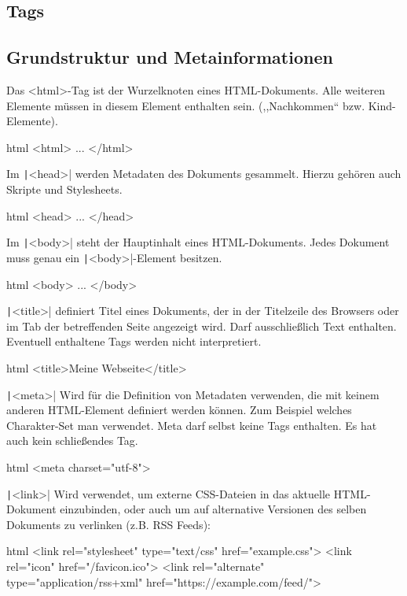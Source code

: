 \documentclass[10pt,a4paper]{article}
\begin{document}
\begin{multicols}{3}
\section*{Tags}
\subsection*{Grundstruktur und Metainformationen}
Das <html>-Tag ist der Wurzelknoten eines HTML-Dokuments. Alle weiteren Elemente müssen in diesem Element enthalten sein. (,,Nachkommen`` bzw. Kind-Elemente).
\begin{codebox}{html}{}
<html> ... </html>
\end{codebox}

Im \texttt|<head>| werden Metadaten des Dokuments gesammelt. Hierzu gehören auch Skripte und Stylesheets.
\begin{codebox}{html}{}
<head> ... </head>
\end{codebox}

Im \texttt|<body>| steht der Hauptinhalt eines HTML-Dokuments. Jedes Dokument muss genau ein \texttt|<body>|-Element besitzen.
\begin{codebox}{html}{}
<body> ... </body>
\end{codebox}

\texttt|<title>| definiert Titel eines Dokuments, der in der Titelzeile des Browsers oder im Tab der betreffenden Seite angezeigt wird. Darf ausschließlich Text enthalten. Eventuell enthaltene Tags werden nicht interpretiert.
\begin{codebox}{html}{}
<title>Meine Webseite</title>
\end{codebox}

\texttt|<meta>| Wird für die Definition von Metadaten verwenden, die mit keinem anderen HTML-Element definiert werden können. Zum Beispiel welches Charakter-Set man verwendet. Meta darf selbst keine Tags enthalten. Es hat auch kein schließendes Tag.
\begin{codebox}{html}{}
<meta charset="utf-8">
\end{codebox}

\texttt|<link>| Wird verwendet, um externe CSS-Dateien in das aktuelle HTML-Dokument einzubinden, oder auch um auf alternative Versionen des selben Dokuments zu verlinken (z.B. RSS Feeds):
\begin{codebox}{html}{}
<link rel="stylesheet" type="text/css" href="example.css">
<link rel="icon" href="/favicon.ico">
<link rel="alternate" type="application/rss+xml" href="https://example.com/feed/">
\end{codebox}


\end{multicols}
\end{document}
